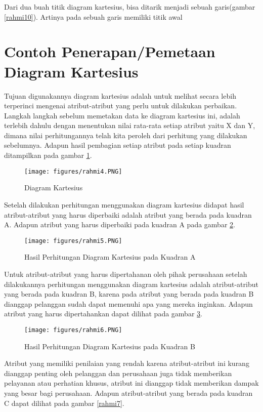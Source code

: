 Dari dua buah titik diagram kartesius, bisa ditarik menjadi sebuah garis(gambar \ref{rahmi10}). Artinya pada sebuah garis memiliki titik awal


\section{Contoh Penerapan/Pemetaan Diagram Kartesius}
Tujuan digunakannya diagram kartesius adalah untuk melihat secara lebih terperinci mengenai atribut-atribut yang perlu untuk dilakukan perbaikan. 
Langkah langkah sebelum memetakan data ke diagram kartesius ini, adalah terlebih dahulu dengan menentukan nilai rata-rata setiap atribut yaitu X dan Y, 
dimana nilai perhitungannya telah kita peroleh dari perhitung yang dilakukan sebelumnya.
Adapun hasil pembagian setiap atribut pada setiap kuadran ditampilkan pada gambar \ref{rahmi4}.
\begin{figure}[ht]
	\centerline{\texttt{[image: figures/rahmi4.PNG]}}
	\caption{Diagram Kartesius}
	\label{rahmi4}
	\end{figure}

Setelah dilakukan perhitungan menggunakan diagram kartesius didapat hasil atribut-atribut yang harus diperbaiki adalah atribut yang berada pada kuadran A.
Adapun atribut yang harus diperbaiki pada kuadran A pada gambar \ref{rahmi5}.

\begin{figure}[ht]
	\centerline{\texttt{[image: figures/rahmi5.PNG]}}
	\caption{Hasil Perhitungan Diagram Kartesius pada Kuadran A}
	\label{rahmi5}
	\end{figure}


Untuk atribut-atribut yang harus dipertahanan oleh pihak perusahaan setelah dilakukannya perhitungan menggunakan diagram kartesius adalah atribut-atribut
yang berada pada kuadran B, karena pada atribut yang berada pada kuadran B dianggap pelanggan sudah dapat memenuhi apa yang mereka inginkan. 
Adapun atribut yang harus dipertahankan dapat dilihat pada gambar \ref{rahmi6}.



\begin{figure}[ht]
	\centerline{\texttt{[image: figures/rahmi6.PNG]}}
	\caption{Hasil Perhitungan Diagram Kartesius pada Kuadran B}
	\label{rahmi6}
	\end{figure}

Atribut yang memiliki penilaian yang rendah karena atribut-atribut ini kurang dianggap penting oleh pelanggan dan perusahaan juga tidak memberikan pelayanan atau perhatian khusus, 
atribut ini dianggap tidak memberikan dampak yang besar bagi perusahaan.
Adapun atribut-atribut yang berada pada kuadran C dapat dilihat pada gambar \ref{rahmi7}.


